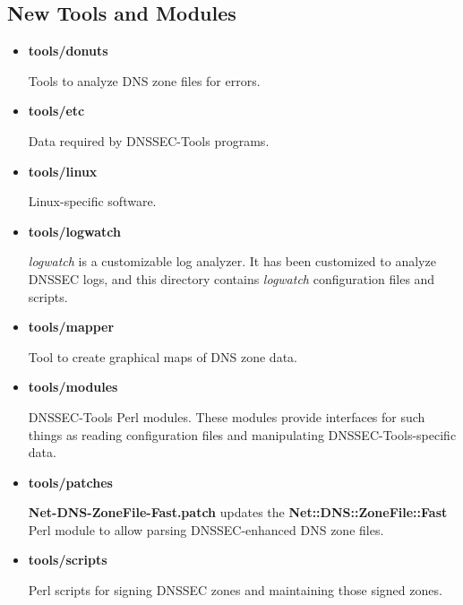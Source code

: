 \documentclass[12pt]{article}
\newcommand{\cmd}[1]{{\em #1}}
\newcommand{\perlmod}[1]{{\bf #1}}
\newcommand{\path}[1]{{\bf #1}}
\begin{document}

\subsection{New Tools and Modules}

\begin{itemize}
\item{\path{tools/donuts}}

Tools to analyze DNS zone files for errors.

\item{\path{tools/etc}}

Data required by DNSSEC-Tools programs.

\item{\path{tools/linux}}

Linux-specific software.

\item{\path{tools/logwatch}}

\cmd{logwatch} is a customizable log analyzer.  It has been customized to
analyze DNSSEC logs, and this directory contains \cmd{logwatch} configuration
files and scripts.

\item{\path{tools/mapper}}

Tool to create graphical maps of DNS zone data.

\item{\path{tools/modules}}

DNSSEC-Tools Perl modules.  These modules provide interfaces for such
things as reading configuration files and manipulating DNSSEC-Tools-specific
data.

\item{\path{tools/patches}}

\path{Net-DNS-ZoneFile-Fast.patch} updates the
\perlmod{Net::DNS::ZoneFile::Fast} Perl module to allow parsing
DNSSEC-enhanced DNS zone files.

\item{\path{tools/scripts}}

Perl scripts for signing DNSSEC zones and maintaining those signed zones.

\end{itemize}


\clearpage

\end{document}
